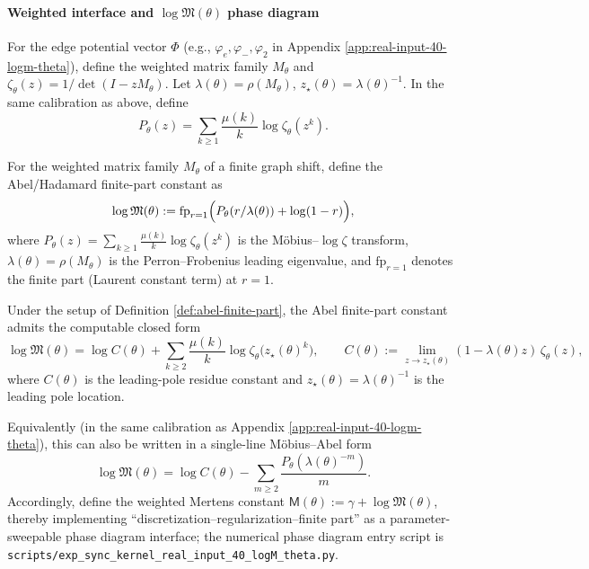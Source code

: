 \paragraph{Weighted interface and \texorpdfstring{$\log\mathfrak{M}(\theta)$}{logM(theta)} phase diagram}
For the edge potential vector $\Phi$ (e.g., $\varphi_e,\varphi_-,\varphi_2$ in Appendix \ref{app:real-input-40-logm-theta}), define the weighted matrix family $M_\theta$ and
\(
\zeta_\theta(z)=1/\det(I-zM_\theta)
\).
Let $\lambda(\theta)=\rho(M_\theta)$, $z_\star(\theta)=\lambda(\theta)^{-1}$. In the same calibration as above, define
\[
P_\theta(z)=\sum_{k\ge 1}\frac{\mu(k)}{k}\log\zeta_\theta(z^k).
\]
\begin{definition}\label{def:abel-finite-part}
For the weighted matrix family $M_\theta$ of a finite graph shift, define the Abel/Hadamard finite-part constant as
\[
\log\mathfrak{M}(\theta):=\mathrm{fp}_{r=1}\Bigl(P_\theta(r/\lambda(\theta))+\log(1-r)\Bigr),
\]
where $P_\theta(z)=\sum_{k\ge 1}\frac{\mu(k)}{k}\log\zeta_\theta(z^k)$ is the M\"{o}bius--$\log\zeta$ transform, $\lambda(\theta)=\rho(M_\theta)$ is the Perron--Frobenius leading eigenvalue, and $\mathrm{fp}_{r=1}$ denotes the finite part (Laurent constant term) at $r=1$.
\end{definition}
\begin{proposition}\label{prop:abel-finite-part-mobius-zeta}
Under the setup of Definition \ref{def:abel-finite-part}, the Abel finite-part constant admits the computable closed form
\[
\log\mathfrak{M}(\theta)
=\log C(\theta)+\sum_{k\ge 2}\frac{\mu(k)}{k}\log\zeta_\theta\bigl(z_\star(\theta)^k\bigr),
\qquad
C(\theta):=\lim_{z\to z_\star(\theta)}(1-\lambda(\theta)z)\,\zeta_\theta(z),
\]
where $C(\theta)$ is the leading-pole residue constant and $z_\star(\theta)=\lambda(\theta)^{-1}$ is the leading pole location.
\end{proposition}
Equivalently (in the same calibration as Appendix \ref{app:real-input-40-logm-theta}), this can also be written in a single-line M\"{o}bius--Abel form
\[
\log\mathfrak{M}(\theta)=\log C(\theta)-\sum_{m\ge 2}\frac{P_\theta(\lambda(\theta)^{-m})}{m}.
\]
Accordingly, define the weighted Mertens constant
\(
\mathsf{M}(\theta):=\gamma+\log\mathfrak{M}(\theta)
\), thereby implementing ``discretization--regularization--finite part'' as a parameter-sweepable phase diagram interface; the numerical phase diagram entry script is
\texttt{scripts/exp\_sync\_kernel\_real\_input\_40\_logM\_theta.py}.

